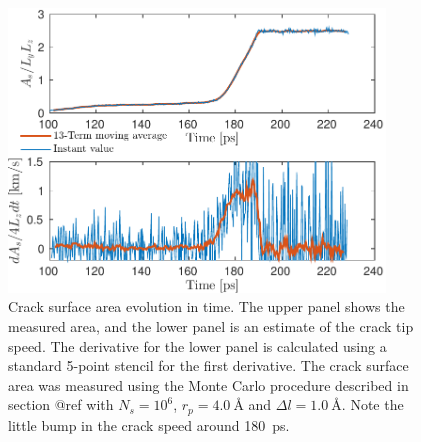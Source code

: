 \begin{figure}
\centering
\includegraphics[width=10cm]{../figures/thesis/crack_area_evolution_1048.pdf}
\caption{Crack surface area evolution in time. The upper panel shows the measured area, and the lower panel is an estimate of the crack tip speed. The derivative for the lower panel is calculated using a standard 5-point stencil for the first derivative. The crack surface area was measured using the Monte Carlo procedure described in section @ref with $N_s = 10^6$, $r_p = \SI{4.0}{\angstrom}$ and $\Delta l = \SI{1.0}{\angstrom}$. Note the little bump in the crack speed around \SI{180}{\pico\second}.}
\label{fig:crack_area_evolution_1048}
\end{figure}

